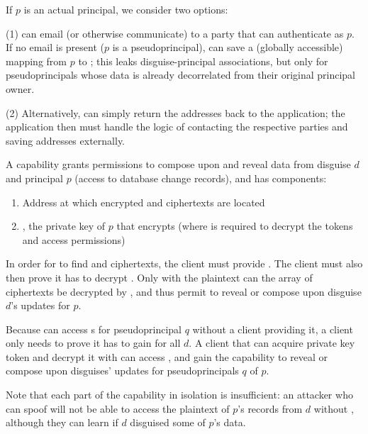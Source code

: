 If $p$ is an actual principal, we consider two options: 

(1) \sys can email (or otherwise communicate)
 to a party that can authenticate as $p$. If no email is present (\eg $p$ is a pseudoprincipal),
\sys can save a (globally accessible) mapping from $p$ to ; this leaks disguise-principal associations, but
only for pseudoprincipals whose data is already decorrelated from their original principal owner.

(2) Alternatively, \sys can simply return the addresses back to the application; the application
then must handle the logic of contacting the respective parties and saving addresses externally.

A capability  grants permissions to compose upon and reveal data from disguise $d$ and
principal $p$ (\ie access to database change records), and has components:
\begin{enumerate}
\item Address  at which encrypted  and  ciphertexts are located
\item {}, the private key of $p$ that encrypts  (where  is required to
    decrypt the  tokens and access permissions)
\end{enumerate}

In order for \sys to find  and  ciphertexts, the client must provide . 
The client must also then prove it has  to decrypt . Only with the
plaintext  can the array of  ciphertexts be decrypted by \sys, and thus permit
\sys to reveal or compose upon disguise $d$'s updates for $p$.

Because \sys can access s for pseudoprincipal $q$ without a client providing it, a client
only needs to prove it has  to gain  for all $d$.  A client that can acquire
private key token  and decrypt it with  can access , and gain the
capability to reveal or compose upon disguises' updates for pseudoprincipals $q$ of $p$. 

Note that each part of the capability in isolation is insufficient: an attacker who can spoof
 will not be able to access the plaintext of $p$'s records from $d$ without , although they can learn if $d$ disguised some of $p$'s data.


